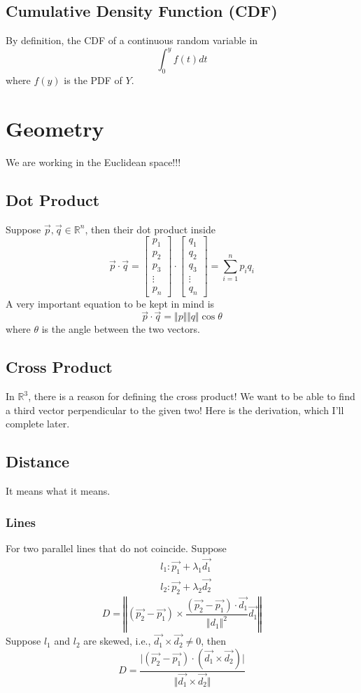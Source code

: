 \documentclass{article}
\theoremstyle{definition}
\theoremstyle{definition}
\theoremstyle{definition}
\theoremstyle{definition}
\theoremstyle{definition}
\theoremstyle{definition}
\theoremstyle{definition}
\theoremstyle{definition}
\theoremstyle{definition}
\newcommand{\RR}{\mathbb{R}}
\begin{document}
\subsection{Cumulative Density Function (CDF)}
By definition, the CDF of a continuous random variable in
\[
\int_0^yf(t)dt    
\]
where $f(y)$ is the PDF of $Y$.
\section{Geometry}
We are working in the Euclidean space!!!
\subsection{Dot Product}
Suppose $\vec{p},\vec{q}\in\RR^n$, then their dot product inside
\[
\vec{p}\cdot\vec{q}=\begin{bmatrix}
    p_1\\p_2\\p_3\\ \vdots\\p_n
\end{bmatrix}\cdot\begin{bmatrix}
    q_1\\q_2\\q_3\\ \vdots\\q_n
\end{bmatrix}  
=\sum_{i=1}^n p_iq_i 
\]
A very important equation to be kept in mind is 
\[\vec{p}\cdot\vec{q}=\Vert p\Vert\Vert q\Vert\cos\theta\]
where $\theta$ is the angle between the two vectors.
\subsection{Cross Product}
In $\RR^3$, there is a reason for defining the cross product! We want to be able to find a third vector perpendicular to the given two! Here is the derivation, which I'll complete later.
\subsection{Distance}
It means what it means.
\subsubsection{Lines}
For two parallel lines that do not coincide. Suppose 
\begin{align*}
    &l_1:\vec{p_1}+\lambda_1\vec{d_1}\\
    &l_2:\vec{p_2}+\lambda_2\vec{d_2}
\end{align*}
\[
D=\left\Vert(\vec{p_2}-\vec{p_1})\times \dfrac{(\vec{p_2}-\vec{p_1})\cdot \vec{d_1}}{\Vert d_1\Vert^2}\vec{d_1}\right\Vert   
\]
Suppose $l_1$ and $l_2$ are skewed, i.e., $\vec{d_1}\times\vec{d_2}\neq 0$, then
\[
D=\dfrac{\vert(\vec{p_2}-\vec{p_1})\cdot(\vec{d_1}\times\vec{d_2})\vert}{\Vert\vec{d_1}\times\vec{d_2}\Vert}    
\]
\end{document}
